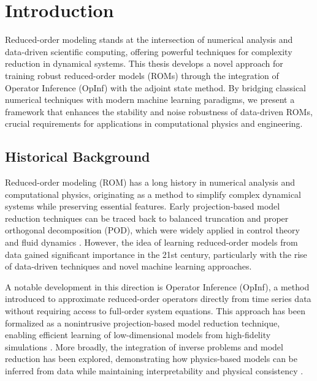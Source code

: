 
\chapter[Introduction]{Introduction}
\label{chap:intro}

Reduced-order modeling stands at the intersection of numerical analysis and data-driven scientific computing, offering powerful techniques for complexity reduction in dynamical systems. This thesis develops a novel approach for training robust reduced-order models (ROMs) through the integration of Operator Inference (OpInf) with the adjoint state method. By bridging classical numerical techniques with modern machine learning paradigms, we present a framework that enhances the stability and noise robustness of data-driven ROMs, crucial requirements for applications in computational physics and engineering.


\section{Historical Background}

Reduced-order modeling (ROM) has a long history in numerical analysis and computational physics, originating as a method to simplify complex dynamical systems while preserving essential features. Early projection-based model reduction techniques can be traced back to balanced truncation and proper orthogonal decomposition (POD), which were widely applied in control theory and fluid dynamics \cite{benner2015survey,quarteroni2015reduced}. However, the idea of learning reduced-order models from data gained significant importance in the 21st century, particularly with the rise of data-driven techniques and novel machine learning approaches.

A notable development in this direction is Operator Inference (OpInf), a method introduced to approximate reduced-order operators directly from time series data without requiring access to full-order system equations. This approach has been formalized as a nonintrusive projection-based model reduction technique, enabling efficient learning of low-dimensional models from high-fidelity simulations \cite{peherstorfer2016data}. More broadly, the integration of inverse problems and model reduction has been explored, demonstrating how physics-based models can be inferred from data while maintaining interpretability and physical consistency \cite{ghattas2021learning}.

